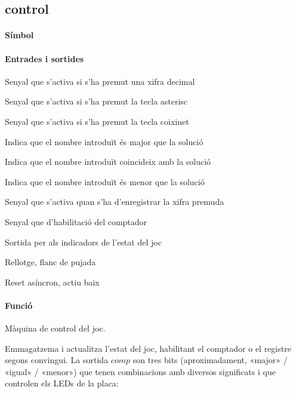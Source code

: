 \subsection{\label{sub:\projectname-control} \textsf{control}}

\paragraph{Símbol}

\begin{center}  \end{center}

\paragraph{Entrades i sortides}

\begin{where}
\item[\nodenamebit{bcd}] Senyal que s'activa si s'ha premut una xifra decimal
\item[\nodenamebit{ast}] Senyal que s'activa si s'ha premut la tecla asterisc
\item[\nodenamebit{coi}] Senyal que s'activa si s'ha premut la tecla coixinet
\item[\nodenamebit{ngtx}] Indica que el nombre introduït és major que la solució
\item[\nodenamebit{neqx}] Indica que el nombre introduït coincideix amb la solució
\item[\nodenamebit{nltx}] Indica que el nombre introduït és menor que la solució
\item[\nodenamebit{eshft}] Senyal que s'activa quan s'ha d'enregistrar la xifra premuda
\item[\nodenamebit{ecnt}] Senyal que d'habilitació del comptador
\item[\nodenamerange{comp}{2}{0}] Sortida per als indicadors de l'estat del joc
\item[\nodenamebit{clk}] Rellotge, flanc de pujada
\item[\nodenamebit{nrst}] Reset asíncron, actiu baix
\end{where}

\paragraph{Funció}

Màquina de control del joc.

Emmagatzema i actualitza l'estat del joc, habilitant el comptador o el registre segons convingui.
La sortida $comp$ son tres bits (aproximadament, «major» / «igual» / «menor») que tenen
combinacions amb diversos significats i que controlen els LEDs de la placa:


